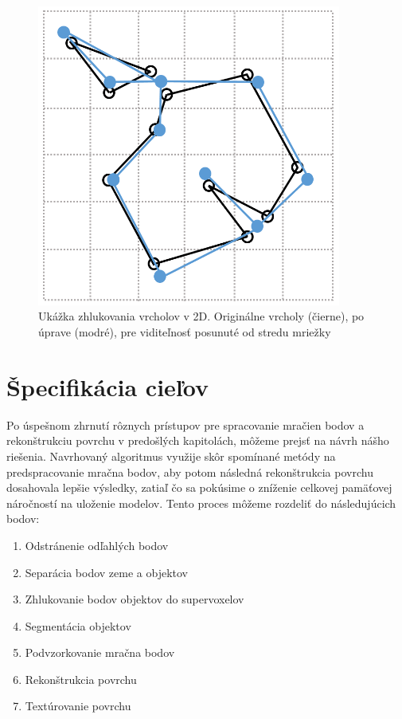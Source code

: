 \newpage\vfill
\begin{figure}[ht]
  \centering
  \includegraphics[width=10cm]{img/vertex_clustering.png}
  \caption{Ukážka zhlukovania vrcholov v 2D. Originálne vrcholy (čierne), po úprave (modré), pre viditeľnosť posunuté od stredu mriežky} 
  \label{fig:verte_cluster}
\end{figure} 
\vfill\clearpage

\section{Špecifikácia cieľov}
\noindent Po úspešnom zhrnutí rôznych prístupov pre spracovanie mračien bodov a rekonštrukciu povrchu v predošlých kapitolách, môžeme prejsť na návrh nášho riešenia. Navrhovaný algoritmus využije skôr spomínané metódy na predspracovanie mračna bodov, aby potom následná rekonštrukcia povrchu dosahovala lepšie výsledky, zatiaľ čo sa pokúsime o zníženie celkovej pamäťovej náročností na uloženie modelov. 
\newline\indent Tento proces môžeme rozdeliť do následujúcich bodov:
\begin{enumerate}
    \item Odstránenie odľahlých bodov
    \item Separácia bodov zeme a objektov
    \item Zhlukovanie bodov objektov do supervoxelov
    \item Segmentácia objektov
    \item Podvzorkovanie mračna bodov
    \item Rekonštrukcia povrchu
    \item Textúrovanie povrchu
\end{enumerate}


